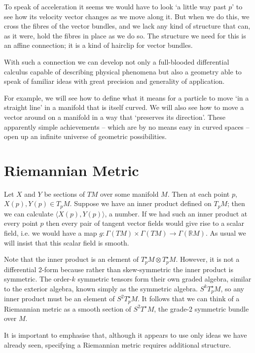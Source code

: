 \documentclass[oneside,english]{amsbook}
\numberwithin{section}{chapter}
\theoremstyle{plain}
\theoremstyle{definition}
\begin{document}
To speak of acceleration it seems we would have to look `a little way past $p$' to see how its velocity vector changes as we move along it. But when we do this, we cross the fibres of the vector bundles, and we lack any kind of structure that can, as it were, hold the fibres in place as we do so. The structure we need for this is an affine connection; it is a kind of hairclip for vector bundles.

With such a connection we can develop not only a full-blooded differential calculus capable of describing physical phenomena but also a geometry able to speak of familiar ideas with great precision and generality of application.

For example, we will see how to define what it means for a particle to move `in a straight line' in a manifold that is itself curved. We will also see how to move a vector around on a manifold in a way that `preserves its direction'. These apparently simple achievements -- which are by no means easy in curved spaces -- open up an infinite universe of geometric possibilities.

\section{Riemannian Metric}

Let $X$ and $Y$ be sections of $TM$ over some manifold $M$. Then at each point $p$, $X(p), Y(p)\in T_pM$. Suppose we have an inner product defined on $T_pM$; then we can calculate $\langle X(p), Y(p)\rangle$, a number. If we had such an inner product at every point $p$ then every pair of tangent vector fields would give rise to a scalar field, i.e. we would have a map $g:\Gamma(TM)\times\Gamma(TM)\to \Gamma(\mathbb{R}M)$. As usual we will insist that this scalar field is smooth.

Note that the inner product is an element of $T^\star_pM\otimes T^\star_pM$. However, it is not a differential 2-form because rather than skew-symmetric the inner product is symmetric. The order-$k$ symmetric tensors form their own graded algebra, similar to the exterior algebra, known simply as the symmetric algebra. $S^kT^\star_pM$, so any inner product must be an element of $S^2T^\star_pM$. It follows that we can think of a Riemannian metric as a smooth section of $S^2T^\star M$, the grade-2 symmetric bundle over $M$.

It is important to emphasise that, although it appears to use only ideas we have already seen, specifying a Riemannian metric requires additional structure.
\end{document}
